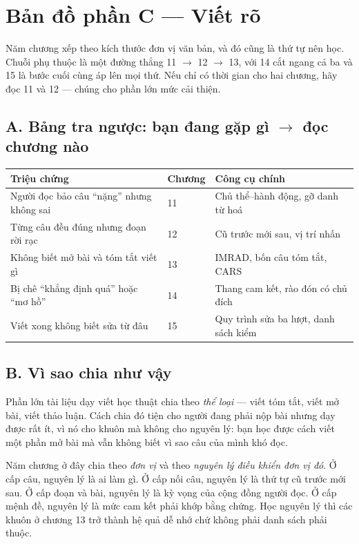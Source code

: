 \documentclass[../english.tex]{subfiles}
\begin{document}
\section*{Bản đồ phần C --- Viết rõ}

\begin{tomtat}
Năm chương xếp theo kích thước đơn vị văn bản, và đó cũng là thứ tự nên học. Chuỗi phụ thuộc là một đường thẳng 11 \(\rightarrow\) 12 \(\rightarrow\) 13, với 14 cắt ngang cả ba và 15 là bước cuối cùng áp lên mọi thứ. Nếu chỉ có thời gian cho hai chương, hãy đọc 11 và 12 --- chúng cho phần lớn mức cải thiện.
\end{tomtat}

\subsection*{A. Bảng tra ngược: bạn đang gặp gì \(\rightarrow\) đọc chương nào}
\begin{center}\footnotesize
\begin{tabularx}{\linewidth}{@{}L{5.6cm}L{2.0cm}Y@{}}
\toprule
\textbf{Triệu chứng} & \textbf{Chương} & \textbf{Công cụ chính}\\
\midrule
Người đọc bảo câu ``nặng'' nhưng không sai & 11 & Chủ thể--hành động, gỡ danh từ hoá\\
Từng câu đều đúng nhưng đoạn rời rạc & 12 & Cũ trước mới sau, vị trí nhấn\\
Không biết mở bài và tóm tắt viết gì & 13 & IMRAD, bốn câu tóm tắt, CARS\\
Bị chê ``khẳng định quá'' hoặc ``mơ hồ'' & 14 & Thang cam kết, rào đón có chủ đích\\
Viết xong không biết sửa từ đâu & 15 & Quy trình sửa ba lượt, danh sách kiểm\\
\bottomrule
\end{tabularx}
\end{center}

\subsection*{B. Vì sao chia như vậy}
Phần lớn tài liệu dạy viết học thuật chia theo \emph{thể loại} --- viết tóm tắt, viết mở bài, viết thảo luận. Cách chia đó tiện cho người đang phải nộp bài nhưng dạy được rất ít, vì nó cho khuôn mà không cho nguyên lý: bạn học được cách viết một phần mở bài mà vẫn không biết vì sao câu của mình khó đọc.

Năm chương ở đây chia theo \emph{đơn vị} và theo \emph{nguyên lý điều khiển đơn vị đó}. Ở cấp câu, nguyên lý là ai làm gì. Ở cấp nối câu, nguyên lý là thứ tự cũ trước mới sau. Ở cấp đoạn và bài, nguyên lý là kỳ vọng của cộng đồng người đọc. Ở cấp mệnh đề, nguyên lý là mức cam kết phải khớp bằng chứng. Học nguyên lý thì các khuôn ở chương 13 trở thành hệ quả dễ nhớ chứ không phải danh sách phải thuộc.
\end{document}
